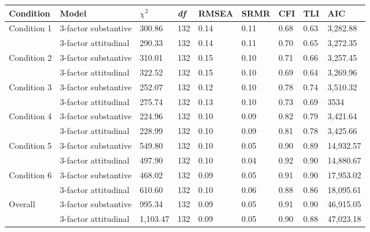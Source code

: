 \documentclass[
  english,
  man]{apa6}
\begin{document}
\begin{longtable}[]{@{}lllllllll@{}}
\toprule
Condition & Model & \(\chi^2\) & \emph{df} & RMSEA & SRMR & CFI & TLI & AIC\tabularnewline
\midrule
\endhead
Condition 1 & 3-factor substantive & 300.86 & 132 & 0.14 & 0.11 & 0.68 & 0.63 & 3,282.88\tabularnewline
& 3-factor attitudinal & 290.33 & 132 & 0.14 & 0.11 & 0.70 & 0.65 & 3,272.35\tabularnewline
Condition 2 & 3-factor substantive & 310.01 & 132 & 0.15 & 0.10 & 0.71 & 0.66 & 3,257.45\tabularnewline
& 3-factor attitudinal & 322.52 & 132 & 0.15 & 0.10 & 0.69 & 0.64 & 3,269.96\tabularnewline
Condition 3 & 3-factor substantive & 252.07 & 132 & 0.12 & 0.10 & 0.78 & 0.74 & 3,510.32\tabularnewline
& 3-factor attitudinal & 275.74 & 132 & 0.13 & 0.10 & 0.73 & 0.69 & 3534\tabularnewline
Condition 4 & 3-factor substantive & 224.96 & 132 & 0.10 & 0.09 & 0.82 & 0.79 & 3,421.64\tabularnewline
& 3-factor attitudinal & 228.99 & 132 & 0.10 & 0.09 & 0.81 & 0.78 & 3,425.66\tabularnewline
Condition 5 & 3-factor substantive & 549.80 & 132 & 0.10 & 0.05 & 0.90 & 0.89 & 14,932.57\tabularnewline
& 3-factor attitudinal & 497.90 & 132 & 0.10 & 0.04 & 0.92 & 0.90 & 14,880.67\tabularnewline
Condition 6 & 3-factor substantive & 468.02 & 132 & 0.09 & 0.05 & 0.91 & 0.90 & 17,953.02\tabularnewline
& 3-factor attitudinal & 610.60 & 132 & 0.10 & 0.06 & 0.88 & 0.86 & 18,095.61\tabularnewline
Overall & 3-factor substantive & 995.34 & 132 & 0.09 & 0.05 & 0.91 & 0.90 & 46,915.05\tabularnewline
& 3-factor attitudinal & 1,103.47 & 132 & 0.09 & 0.05 & 0.90 & 0.88 & 47,023.18\tabularnewline
\bottomrule
\end{longtable}
\end{document}
